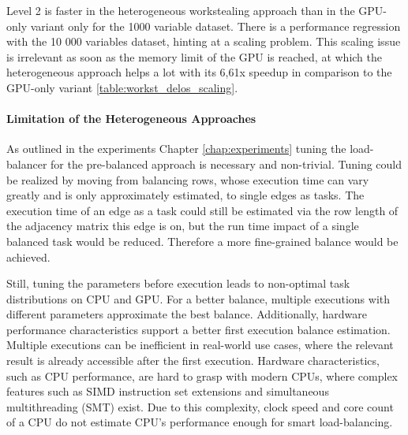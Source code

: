 Level 2 is faster in the heterogeneous workstealing approach than in the GPU-only variant only for the 1000 variable dataset. There is a performance regression with the 10 000 variables dataset, hinting at a scaling problem.
This scaling issue is irrelevant as soon as the memory limit of the GPU is reached, at which the heterogeneous approach helps a lot with its 6,61x speedup in comparison to the GPU-only variant \ref{table:workst_delos_scaling}.


\paragraph{Limitation of the Heterogeneous Approaches}

As outlined in the experiments Chapter \ref{chap:experiments} tuning the load-balancer for the pre-balanced approach is necessary and non-trivial. Tuning could be realized by moving from balancing rows, whose execution time can vary greatly and is only approximately estimated, to single edges as tasks. The execution time of an edge as a task could still be estimated via the row length of the adjacency matrix this edge is on, but the run time impact of a single balanced task would be reduced. Therefore a more fine-grained balance would be achieved.

Still, tuning the parameters before execution leads to non-optimal task distributions on CPU and GPU. For a better balance, multiple executions with different parameters approximate the best balance. Additionally, hardware performance characteristics support a better first execution balance estimation. Multiple executions can be inefficient in real-world use cases, where the relevant result is already accessible after the first execution. Hardware characteristics, such as CPU performance, are hard to grasp with modern CPUs, where complex features such as SIMD instruction set extensions and simultaneous multithreading (SMT) exist. Due to this complexity, clock speed and core count of a CPU do not estimate CPU's performance enough for smart load-balancing.

